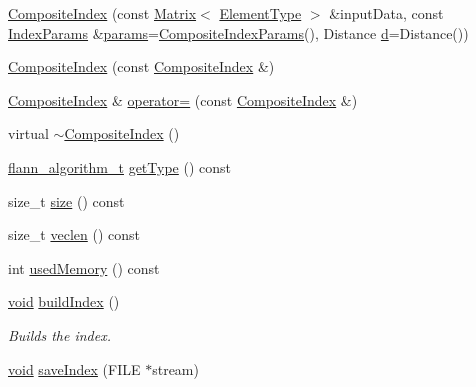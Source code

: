\begin{DoxyCompactItemize}
\item 
\hyperlink{classcvflann_1_1CompositeIndex_a4f60067d01b598c83d4eb87406987240}{Composite\-Index} (const \hyperlink{classcvflann_1_1Matrix}{Matrix}$<$ \hyperlink{classcvflann_1_1CompositeIndex_a3953e495ac70dfec4d1165a8f95b5fad}{Element\-Type} $>$ \&input\-Data, const \hyperlink{namespacecvflann_a742b4c7076c21012054af74a9ee48289}{Index\-Params} \&\hyperlink{compat_8hpp_a0480a03ecc41b20cde376602531d9270}{params}=\hyperlink{structcvflann_1_1CompositeIndexParams}{Composite\-Index\-Params}(), Distance \hyperlink{legacy_8hpp_a6f364afbe132c4ecfea48bde1b0618ba}{d}=Distance())
\item 
\hyperlink{classcvflann_1_1CompositeIndex_a74d036c97084a4f0e243ea58f0c8bfc9}{Composite\-Index} (const \hyperlink{classcvflann_1_1CompositeIndex}{Composite\-Index} \&)
\item 
\hyperlink{classcvflann_1_1CompositeIndex}{Composite\-Index} \& \hyperlink{classcvflann_1_1CompositeIndex_a49433d3c01dce80aadec1dee46df5fe2}{operator=} (const \hyperlink{classcvflann_1_1CompositeIndex}{Composite\-Index} \&)
\item 
virtual \hyperlink{classcvflann_1_1CompositeIndex_ad3cc707b637c5eea0fd63395bebb6d59}{$\sim$\-Composite\-Index} ()
\item 
\hyperlink{namespacecvflann_a4e3e6c98d774ea77fd7f0045c9bc7817}{flann\-\_\-algorithm\-\_\-t} \hyperlink{classcvflann_1_1CompositeIndex_ae9e27649f06840a207ee2caf5a09edb6}{get\-Type} () const 
\item 
size\-\_\-t \hyperlink{classcvflann_1_1CompositeIndex_adef172afa9aadda2ec028f240deebade}{size} () const 
\item 
size\-\_\-t \hyperlink{classcvflann_1_1CompositeIndex_a756ca64ccd989d3f3b7dd6f4d58c1fe3}{veclen} () const 
\item 
int \hyperlink{classcvflann_1_1CompositeIndex_a12c2ffc4d98f748f27a8182ad82f0563}{used\-Memory} () const 
\item 
\hyperlink{legacy_8hpp_a8bb47f092d473522721002c86c13b94e}{void} \hyperlink{classcvflann_1_1CompositeIndex_a8c4e6e1f9553a63fe55ca29219d4d127}{build\-Index} ()
\begin{DoxyCompactList}\small\item\em Builds the index. \end{DoxyCompactList}\item 
\hyperlink{legacy_8hpp_a8bb47f092d473522721002c86c13b94e}{void} \hyperlink{classcvflann_1_1CompositeIndex_a01370778859dbe6d678a182eeef310af}{save\-Index} (F\-I\-L\-E $\ast$stream)

\end{DoxyCompactItemize}
